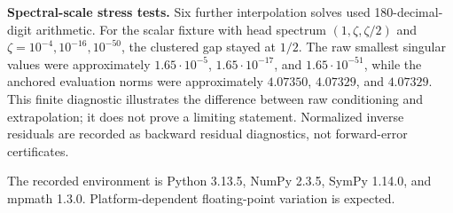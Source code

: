 \textbf{Spectral-scale stress tests.} Six further interpolation solves used 180-decimal-digit arithmetic. For the scalar fixture with head spectrum $(1,\zeta,\zeta/2)$ and $\zeta=10^{-4},10^{-16},10^{-50}$, the clustered gap stayed at $1/2$. The raw smallest singular values were approximately $1.65\cdot10^{-5}$, $1.65\cdot10^{-17}$, and $1.65\cdot10^{-51}$, while the anchored evaluation norms were approximately $4.07350$, $4.07329$, and $4.07329$. This finite diagnostic illustrates the difference between raw conditioning and extrapolation; it does not prove a limiting statement. Normalized inverse residuals are recorded as backward residual diagnostics, not forward-error certificates.

The recorded environment is Python 3.13.5, NumPy 2.3.5, SymPy 1.14.0, and mpmath 1.3.0. Platform-dependent floating-point variation is expected.
